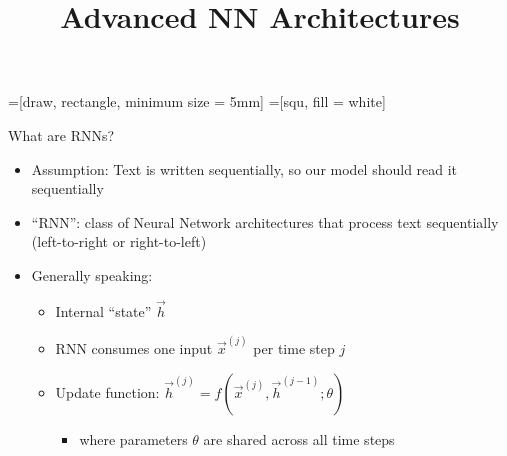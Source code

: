 



=[draw, rectangle, minimum size = 5mm]
=[squ, fill = white]

\newcommand{\learninggoals}{
\item Understand recurent structure of RNNs
\item Learn the different types of RNNs
\item Understand applicability of RNNs}

\title{Advanced NN Architectures}
\date{}




\begin{vbframe}{What are RNNs?}

\vfill

\begin{itemize}
	\item Assumption: Text is written sequentially, so our model should read it sequentially
	\item ``RNN'': class of Neural Network architectures that process text sequentially (left-to-right or right-to-left)
	\item Generally speaking:
		\begin{itemize}
			\item Internal ``state'' $\vec h$
			\item RNN consumes one input $\vec x^{(j)}$ per time step $j$
			\item Update function: $\vec h^{(j)} = f(\vec x^{(j)}, \vec h^{({j-1})}; \theta)$
			\begin{itemize}
				\item where parameters $\theta$ are shared across all time steps
			\end{itemize}
		\end{itemize}
\end{itemize}

\vfill

\end{vbframe}


